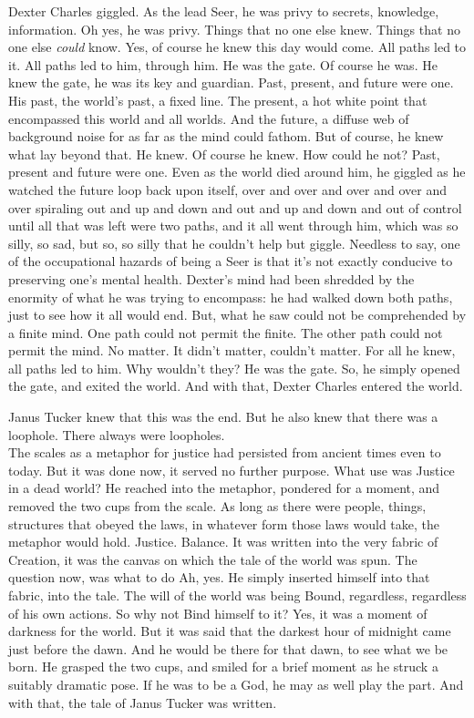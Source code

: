 Dexter Charles giggled. As the lead Seer, he was privy to secrets, knowledge, information. Oh yes, he was privy. Things that no one else knew. Things that no one else \emph{could} know. Yes, of course he knew this day would come. All paths led to it.
\SmallVSpace
All paths led to him, through him. He was the gate. Of course he was. He knew the gate, he was its key and guardian. Past, present, and future were one. His past, the world’s past, a fixed line. The present, a hot white point that encompassed this world and all worlds. And the future, a diffuse web of background noise for as far as the mind could fathom.
\SmallVSpace
But of course, he knew what lay beyond that. He knew. Of course he knew. How could he not? Past, present and future were one. Even as the world died around him, he giggled as he watched the future loop back upon itself, over and over and over and over and over spiraling out and up and down and out and up and down and out of control until all that was left were two paths, and it all went through him, which was so silly, so sad, but so, so silly that he couldn’t help but giggle.
\SmallVSpace
Needless to say, one of the occupational hazards of being a Seer is that it’s not exactly conducive to preserving one’s mental health. Dexter’s mind had been shredded by the enormity of what he was trying to encompass: he had walked down both paths, just to see how it all would end. But, what he saw could not be comprehended by a finite mind.
\SmallVSpace
One path could not permit the finite.
\SmallVSpace
The other path could not permit the mind.
\SmallVSpace
No matter. It didn’t matter, couldn’t matter. For all he knew, all paths led to him. Why wouldn’t they? He was the gate. So, he simply opened the gate, and exited the world.
\SomeVSpace
And with that, Dexter Charles entered the world.
\simpleline
\SmallVSpace
{}

Janus Tucker knew that this was the end. But he also knew that there was a loophole. There always were loopholes.\\The scales as a metaphor for justice had persisted from ancient times even to today. But it was done now, it served no further purpose. What use was Justice in a dead world? He reached into the metaphor, pondered for a moment, and removed the two cups from the scale.
\SmallVSpace
As long as there were people, things, structures that obeyed the laws, in whatever form those laws would take, the metaphor would hold. Justice. Balance. It was written into the very fabric of Creation, it was the canvas on which the tale of the world was spun.
\SmallVSpace
The question now, was what to do{\el} Ah, yes. He simply inserted himself into that fabric, into the tale. The will of the world was being Bound, regardless, regardless of his own actions. So why not Bind himself to it? Yes, it was a moment of darkness for the world. But it was said that the darkest hour of midnight came just before the dawn. And he would be there for that dawn, to see what we be born.
\SmallVSpace
He grasped the two cups, and smiled for a brief moment as he struck a suitably dramatic pose. If he was to be a God, he may as well play the part.
\SomeVSpace
And with that, the tale of Janus Tucker was written.
\simpleline
{}

